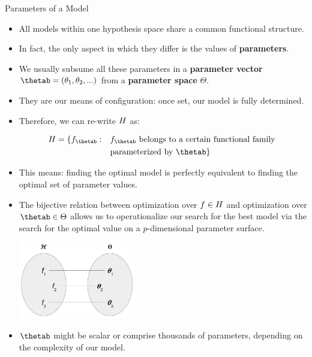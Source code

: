 \documentclass[11pt,compress,t,notes=noshow, xcolor=table]{beamer}
\begin{document}
\begin{vbframe}{Parameters of a Model}

\begin{itemize}
  
  \item All models within one hypothesis space share a common functional 
  structure.
  
  \item In fact, the only aspect in which they differ is the values of 
  \textbf{parameters}.
  
  \item We usually subsume all these parameters in a \textbf{parameter vector} 
  $\thetab = (\theta_1, \theta_2, ...)$ from a \textbf{parameter space} 
  $\Theta$.
  
  \item They are our means of configuration: once set, our model is fully 
  determined.
  
  \item Therefore, we can re-write $H$ as:

  \begin{equation*}
    \begin{split}
      \Hspace = \{f_{\thetab}: \quad & f_{\thetab} \text{ belongs to a certain
       functional family } \\
       & \text{parameterized by } \thetab\}
    \end{split}
  \end{equation*}
  
  \framebreak
  
  \item This means: finding the optimal model is perfectly equivalent to 
  finding the optimal set of parameter values.
  
  \item The bijective relation between optimization over $f \in H$ and 
  optimization over $\thetab \in \Theta$ allows us to operationalize our search
  for the best model via the search for the optimal value on a $p$-dimensional
  parameter surface.
  
  \begin{center}
    \includegraphics[width = 0.4\textwidth]{figure_man/bijection_f_theta.PNG} 
  \end{center}
  
  \item $\thetab$ might be scalar or comprise thousands of parameters,
  depending on the complexity of our model.
  
\end{itemize}

\end{vbframe}
\end{document}
